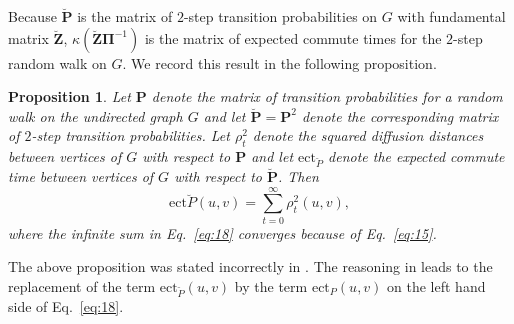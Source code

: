 \documentclass[10pt,twocolumn]{article}
\newtheorem{proposition}[theorem]{Proposition}
\numberwithin{equation}{section}
\begin{document}
Because $\breve{\mathbf{P}}$ is the matrix of $2$-step transition
probabilities on $G$ with fundamental matrix $\breve{\mathbf{Z}}$,
$\kappa \left( \breve{\mathbf{Z}} \bm{\Pi}^{-1} \right)$ is the
matrix of expected commute times for the $2$-step random walk on $G$.
We record this result in the following proposition.
\begin{proposition}
  \label{prop:7}
Let $\mathbf{P}$ denote the matrix of transition probabilities for  
a random walk on the undirected graph $G$ and let
$\breve{\mathbf{P}} = \mathbf{P}^{2}$ denote the corresponding
matrix of $2$-step transition probabilities.  Let
$\rho_{t}^{2}$ denote the squared diffusion distances between
  vertices of $G$ with respect to
  $\mathbf{P}$ and let
$\mathrm{ect}_{\breve{P}}$ denote the expected
  commute
  time between vertices of $G$ with respect to $\breve{\mathbf{P}}$.
Then
  \begin{equation}
    \label{eq:18}
    \mathrm{ect}{\breve{P}}(u,v) = \sum_{t = 0}^{\infty}{\rho_{t}^{2}(u,v)},
  \end{equation}
where the infinite sum in Eq.~\eqref{eq:18} converges because of Eq.~\eqref{eq:15}.
\end{proposition}
The above proposition was stated incorrectly in
\cite{qui07:_clust}. The reasoning in \cite{qui07:_clust} leads to
the replacement of the term $\mathrm{ect}_{\breve{P}}(u,v)$ by the term
$\mathrm{ect}_{P}(u,v)$ on the left hand side of Eq.~\eqref{eq:18}.
%
%
%
\end{document}
